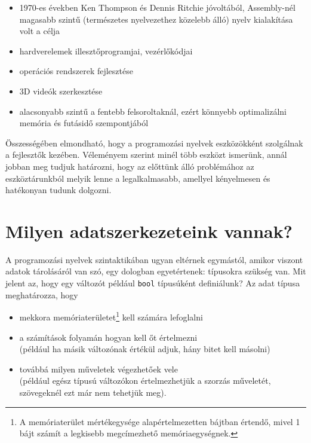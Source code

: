 \documentclass[tocnopagenum]{thesis-ekf}
\theoremstyle{definition}
\theoremstyle{remark}
\begin{document}
\begin{enumerate}
\begin{itemize}
			\item 1970-es években Ken Thompson és Dennis Ritchie jóvoltából, Assembly-nél magasabb szintű (természetes nyelvezethez közelebb álló) nyelv kialakítása volt a célja
			\item hardverelemek illesztőprogramjai, vezérlőkódjai
			\item operációs rendszerek fejlesztése
			\item 3D videók szerkesztése
			\item alacsonyabb szintű a fentebb felsoroltaknál, ezért könnyebb optimalizálni memória és futásidő szempontjából
			\cite{clang1}
		\end{itemize}
	\end{enumerate}
	Összességében elmondható, hogy a programozási nyelvek eszközökként szolgálnak a fejlesztők kezében. Véleményem szerint minél több eszközt ismerünk, annál jobban meg tudjuk határozni, hogy az előttünk álló problémához az eszköztárunkból melyik lenne a legalkalmasabb, amellyel kényelmesen és hatékonyan tudunk dolgozni.
	\section{Milyen adatszerkezeteink vannak?}
	A programozási nyelvek szintaktikában ugyan eltérnek egymástól, amikor viszont adatok tárolásáról van szó, egy dologban egyetértenek: típusokra szükség van. Mit jelent az, hogy egy változót például \verb*|bool| típusúként definiálunk? Az adat típusa meghatározza, hogy
	\begin{itemize}
		\item mekkora memóriaterületet\footnote{A memóriaterület mértékegysége alapértelmezetten bájtban értendő, mivel 1 bájt számít a legkisebb megcímezhető memóriaegységnek.} kell számára lefoglalni
		\item a számítások folyamán hogyan kell őt értelmezni\\(például ha másik változónak értékül adjuk, hány bitet kell másolni)
		\item továbbá milyen műveletek végezhetőek vele\\(például egész típusú változókon értelmezhetjük a szorzás műveletét, szövegeknél ezt már nem tehetjük meg).\cite{adatszerkezetek_88}
	\end{itemize}
\end{document}
